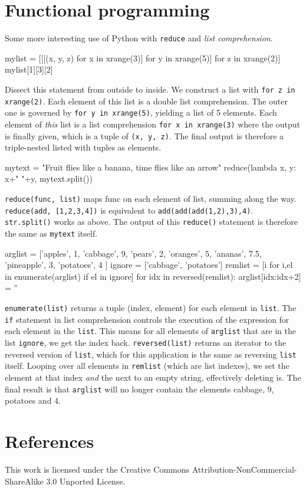 \documentclass[draft=false]{article}
\newcommand{\answer}[1]{#1}%
\def\pythoni{\lstinline[language=pythontim]}
\begin{document}
\section{Functional programming}

Some more interesting use of Python with \pythoni{reduce} and \emph{list comprehension}.

\begin{python}
mylist = [[[(x, y, z) for x in xrange(3)] for y in xrange(5)] for z in xrange(2)]
mylist[1][3][2]
\end{python}

\answer{Dissect this statement from outside to inside. We construct a list with \pythoni{for z in xrange(2)}. Each element of this list is a double list comprehension. The outer one is governed by \pythoni{for y in xrange(5)}, yielding a list of 5 elements. Each element of \emph{this} list is a list comprehension \pythoni{for x in xrange(3)} where the output is finally given, which is a tuple of \pythoni{(x, y, z)}. The final output is therefore a triple-nested listed with tuples as elements.}

\begin{python}
mytext = "Fruit flies like a banana, time flies like an arrow"
reduce(lambda x, y: x+" "+y, mytext.split())
\end{python}

\answer{\pythoni{reduce(func, list)} maps func on each element of list, summing along the way. \pythoni{reduce(add, [1,2,3,4])} is equivalent to \pythoni{add(add(add(1,2),3),4)}. \pythoni{str.split()} works as above. The output of this \pythoni{reduce()} statement is therefore the same as \pythoni{mytext} itself.}

\begin{python}
arglist = ['apples', 1, 'cabbage', 9, 'pears', 2, 'oranges', 5, 'ananas', 7.5, 'pineapple', 3, 'potatoes', 4 ]
ignore = ['cabbage', 'potatoes']
remlist = [i for i,el in enumerate(arglist) if el in ignore]
for idx in reversed(remlist):
	arglist[idx:idx+2] = ''
\end{python}

\answer{\pythoni{enumerate(list)} returns a tuple (index, element) for each element in \pythoni{list}. The \pythoni{if} statement in list comprehension controls the execution of the expression for each element in the \pythoni{list}. This means for all elements of \pythoni{arglist} that are in the list \pythoni{ignore}, we get the index back. \pythoni{reversed(list)} returns an iterator to the reversed version of \pythoni{list}, which for this application is the same as reversing \pythoni{list} itself. Looping over all elements in \pythoni{remlist} (which are list indexes), we set the element at that index \emph{and} the next to an empty string, effectively deleting is. The final result is that \pythoni{arglist} will no longer contain the elements cabbage, 9, potatoes and 4.}


\section*{References}


This work is licensed under the Creative Commons Attribution-NonCommercial-ShareAlike 3.0 Unported License.
\end{document}
